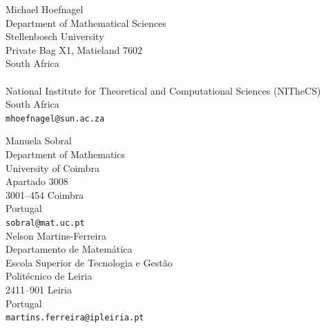 \documentclass[12pt]{article}
\begin{document}
\bigskip
\noindent
Michael Hoefnagel \\ 
\noindent
Department of Mathematical Sciences\\
Stellenbosch University\\
Private Bag X1, Matieland 7602\\
South Africa\\
\quad \\ 
National Institute for Theoretical and Computational Sciences (NITheCS)\\
South Africa \\ 
\texttt{mhoefnagel@sun.ac.za}


\bigskip
\noindent
Manuela Sobral\\
\noindent
Department of Mathematics\\
University of Coimbra\\
Apartado 3008\\
3001--454 Coimbra\\
Portugal\\
\texttt{sobral@mat.uc.pt} \\ 

\bigskip 
\bigskip
\noindent
Nelson Martins-Ferreira\\
\noindent
Departamento de Matemática\\
Escola Superior de Tecnologia e Gestão\\
Politécnico de Leiria\\
2411--901 Leiria\\
Portugal\\
\texttt{martins.ferreira@ipleiria.pt}
\end{document}
